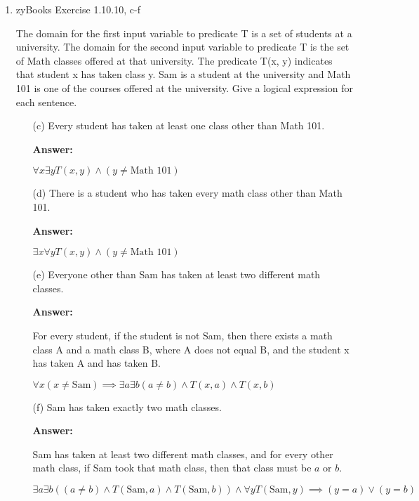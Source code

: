 \documentclass[12pt]{extreport}
\newcommand{\answer}[0]{\medskip \textbf{Answer:} \medskip}
\begin{document}
\begin{enumerate}
    \item zyBooks Exercise 1.10.10, c-f
    
    The domain for the first input variable to predicate T is a set of students at a university. The domain for the second input variable to predicate T is the set of Math classes offered at that university. The predicate T(x, y) indicates that student x has taken class y. Sam is a student at the university and Math 101 is one of the courses offered at the university. Give a logical expression for each sentence.

        \begin{enumerate}

            \item[(c)] Every student has taken at least one class other than Math 101.
            
                \answer

                \( \forall x \exists y T(x, y) \land (y \neq \text{Math 101}) \)

            \item[(d)] There is a student who has taken every math class other than Math 101.
            
                \answer

                \( \exists x \forall y T(x, y) \land (y \neq \text{Math 101}) \)

            \item[(e)] Everyone other than Sam has taken at least two different math classes.
            
                \answer

                For every student, if the student is not Sam, then there exists a math class A and a math class B, where A does not equal B, and the student x has taken A and has taken B.
     
                \( 
                    \forall x (x \neq \text{Sam}) \implies 
                    \exists a \exists b (a \neq b) \land T(x, a) \land T(x, b) 
                \)

            \item[(f)] Sam has taken exactly two math classes.
            
                \answer

                Sam has taken at least two different math classes, and for every other math class, if Sam took that math class, then that class must be \( a \) or \( b \).

                \( 
                    \exists a \exists b ((a \neq b) \land T(\text{Sam}, a) \land T(\text{Sam}, b)) 
                    \land \forall y T(\text{Sam}, y) \implies (y = a) \lor (y = b)
                \)

        \end{enumerate}

\end{enumerate}
\newpage
\end{document}
